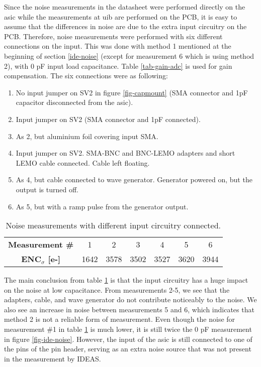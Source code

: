 \documentclass[../main/thesis.tex]{subfiles}
\begin{document}
Since the noise measurements in the datasheet were performed directly on the \gls{asic} while the measurements at \gls{uib} are performed on the \gls{PCB}, it is easy to assume that the differences in noise are due to the extra input circuitry on the \gls{PCB}. Therefore, noise measurements were performed with six different connections on the input. This was done with method 1 mentioned at the beginning of section \ref{ide-noise} (except for measurement 6 which is using method 2), with 0 pF input load capacitance. Table \ref{tab-gain-adc} is used for gain compensation. The six connections were as following:
\begin{enumerate}  
	\item No input jumper on SV2 in figure \ref{fig-capmount} (SMA connector and 1pF capacitor disconnected from the \gls{asic}).
	\item Input jumper on SV2 (SMA connector and 1pF connected).
	\item As 2, but aluminium foil covering input SMA.
	\item Input jumper on SV2. SMA-BNC and BNC-LEMO adapters and short LEMO cable connected. Cable left floating.
	\item As 4, but cable connected to wave generator. Generator powered on, but the output is turned off.
	\item As 5, but with a ramp pulse from the generator output.   
\end{enumerate}

\begin{table}[h!]
	\begin{center}
		\caption{Noise measurements with different input circuitry connected.}
		\label{tab-noise-input}
		\begin{tabular}{ccccccc}\toprule
			\textbf{Measurement \#}      & 1    & 2    & 3    & 4    & 5    & 6   \\ 
			\textbf{ENC$_\sigma$ [e-]} & 1642 & 3578 & 3502 & 3527 & 3620 & 3944   \\ \bottomrule
		\end{tabular}
	\end{center}
\end{table}

The main conclusion from table \ref{tab-noise-input} is that the input circuitry has a huge impact on the noise at low capacitance. From measurements 2-5, we see that the adapters, cable, and wave generator do not contribute noticeably to the noise. We also see an increase in noise between measurements 5 and 6, which indicates that method 2 is not a reliable form of measurement. Even though the noise for measurement \#1 in table \ref{tab-noise-input} is much lower, it is still twice the 0 pF measurement in figure \ref{fig-ide-noise}. However, the input of the \gls{asic} is still connected to one of the pins of the pin header, serving as an extra noise source that was not present in the measurement by IDEAS. 
\end{document}
